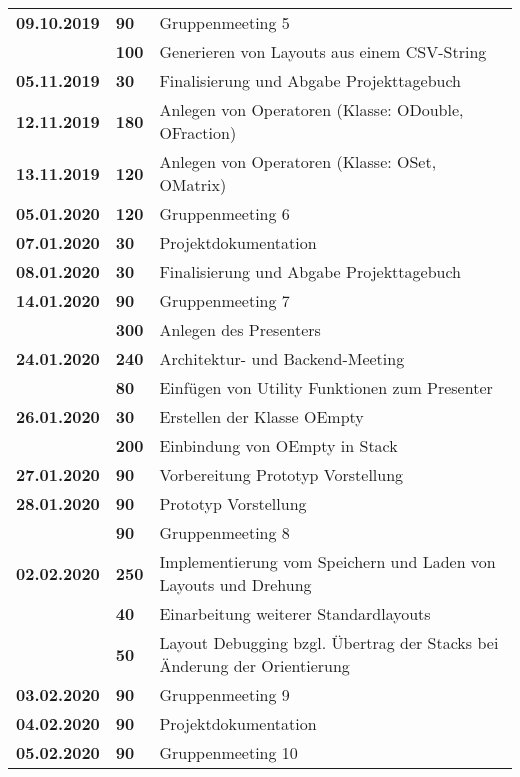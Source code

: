 {{\begin{longtable}{|l|l|p{11cm}|}
		\\ \hline \textbf{09.10.2019}
			& \textbf{\hfill 90} & Gruppenmeeting 5 \\\cline{2-3}
			& \textbf{\hfill 100} & Generieren von Layouts aus einem CSV-String 
		\\ \hline \textbf{05.11.2019}
			& \textbf{\hfill 30} & Finalisierung und Abgabe Projekttagebuch
		\\ \hline \textbf{12.11.2019}
			& \textbf{\hfill 180} & Anlegen von Operatoren (Klasse: ODouble, OFraction) 
		\\ \hline \textbf{13.11.2019}
			& \textbf{\hfill 120} & Anlegen von Operatoren (Klasse: OSet, OMatrix) 
		\\ \hline \textbf{05.01.2020}
			& \textbf{\hfill 120} & Gruppenmeeting 6
		\\ \hline \textbf{07.01.2020}
			& \textbf{\hfill 30} & Projektdokumentation
		\\ \hline \textbf{08.01.2020}
			& \textbf{\hfill 30} & Finalisierung und Abgabe Projekttagebuch
		\\ \hline \textbf{14.01.2020}
			& \textbf{\hfill 90} & Gruppenmeeting 7 \\\cline{2-3}
			& \textbf{\hfill 300} & Anlegen des Presenters
		\\ \hline \textbf{24.01.2020}
			& \textbf{\hfill 240} & Architektur- und Backend-Meeting \\\cline{2-3}
			& \textbf{\hfill 80} & Einfügen von Utility Funktionen zum Presenter 
		\\ \hline \textbf{26.01.2020}
			& \textbf{\hfill 30} & Erstellen der Klasse OEmpty  \\\cline{2-3}
			& \textbf{\hfill 200} & Einbindung von OEmpty in Stack 
		\\ \hline \textbf{27.01.2020}
			& \textbf{\hfill 90} & Vorbereitung Prototyp Vorstellung
		\\ \hline \textbf{28.01.2020}
			& \textbf{\hfill 90} & Prototyp Vorstellung \\\cline{2-3}
			& \textbf{\hfill 90} & Gruppenmeeting 8
		\\ \hline \textbf{02.02.2020}
			& \textbf{\hfill 250} & Implementierung vom Speichern und Laden von Layouts und Drehung \\\cline{2-3}
			& \textbf{\hfill 40} & Einarbeitung weiterer Standardlayouts  \\\cline{2-3}
			& \textbf{\hfill 50} & Layout Debugging bzgl. Übertrag der Stacks bei Änderung der Orientierung
		\\ \hline \textbf{03.02.2020}
			& \textbf{\hfill 90} & Gruppenmeeting 9
		\\ \hline \textbf{04.02.2020}
			& \textbf{\hfill 90} & Projektdokumentation
		\\ \hline \textbf{05.02.2020}
			& \textbf{\hfill 90} & Gruppenmeeting 10 
		\\ \hline
	\end{longtable}
}

}
